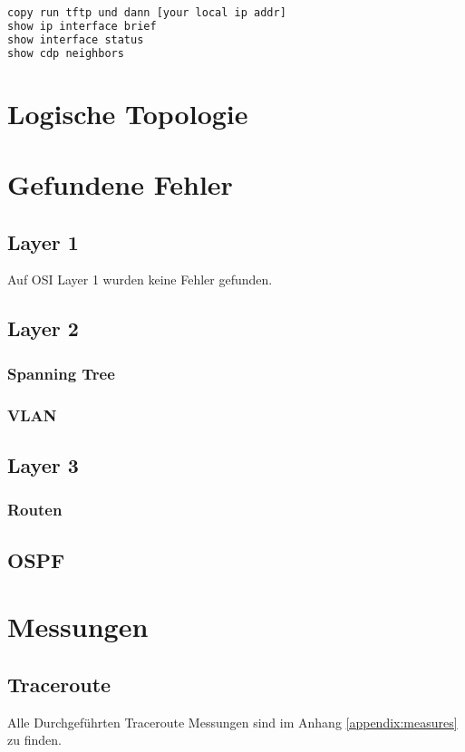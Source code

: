 \begin{lstlisting}[language=bash]
copy run tftp und dann [your local ip addr]
show ip interface brief
show interface status
show cdp neighbors
\end{lstlisting}

\section{Logische Topologie}

\section{Gefundene Fehler}
\subsection{Layer 1}
Auf OSI Layer 1 wurden keine Fehler gefunden.

\subsection{Layer 2}
\subsubsection{Spanning Tree}

\subsubsection{VLAN}

\subsection{Layer 3}

\subsubsection{Routen}

\subsection{OSPF}


\section{Messungen}
\subsection{Traceroute}
Alle Durchgeführten Traceroute Messungen sind im Anhang \ref{appendix:measures} zu finden.

